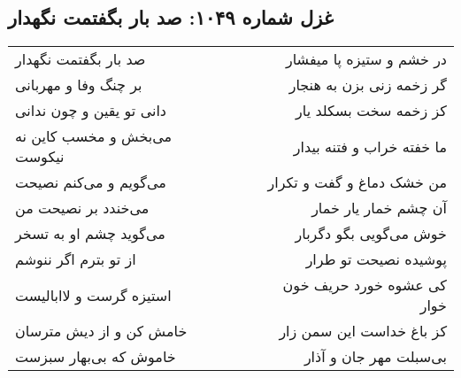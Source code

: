 \begin{center}
\section*{غزل شماره ۱۰۴۹: صد بار بگفتمت نگهدار}
\label{sec:1049}
\begin{longtable}{l p{0.5cm} r}
صد بار بگفتمت نگهدار
&&
در خشم و ستیزه پا میفشار
\\
بر چنگ وفا و مهربانی
&&
گر زخمه زنی بزن به هنجار
\\
دانی تو یقین و چون ندانی
&&
کز زخمه سخت بسکلد یار
\\
می‌بخش و مخسب کاین نه نیکوست
&&
ما خفته خراب و فتنه بیدار
\\
می‌گویم و می‌کنم نصیحت
&&
من خشک دماغ و گفت و تکرار
\\
می‌خندد بر نصیحت من
&&
آن چشم خمار یار خمار
\\
می‌گوید چشم او به تسخر
&&
خوش می‌گویی بگو دگربار
\\
از تو بترم اگر ننوشم
&&
پوشیده نصیحت تو طرار
\\
استیزه گرست و لاابالیست
&&
کی عشوه خورد حریف خون خوار
\\
خامش کن و از دیش مترسان
&&
کز باغ خداست این سمن زار
\\
خاموش که بی‌بهار سبزست
&&
بی‌سبلت مهر جان و آذار
\\
\end{longtable}
\end{center}
